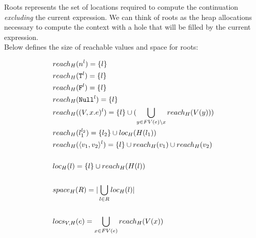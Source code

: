 \documentclass[11pt]{article}
\newcommand{\irl}[1]{\mathtt{#1}}
\begin{document}
Roots represents the set of locations required to compute the continuation \emph{excluding} the current expression.
We can think of roots as the heap allocations necessary to compute the context with a hole that will be filled
by the current expression.\\

Below defines the size of reachable values and space for roots:

\begin{align*}
  &reach_{H}(n^l) = \{l\}\\
  &reach_{H}(\irl{T}^l) = \{l\}\\
  &reach_{H}(\irl{F}^l) = \{l\}\\
  &reach_{H}(\irl{Null}^l) = \{l\}\\
  &reach_{H}((V, x.e)^l) = \{l\} \cup (\bigcup\limits_{y \in FV(e) \setminus x} reach_H(V(y))) \\
  &reach_{H}(l_1^{l_2}) = \{l_2\} \cup loc_{H}(H(l_1))\\
  &reach_{H}(\pairexcst{v_1}{v_2}^l) = \{l\} \cup reach_{H}(v_1) \cup reach_{H}(v_2)\\\\
  &loc_{H}(l) = \{l\} \cup reach_{H}(H(l))\\\\
  &space_{H}(R) = |\bigcup\limits_{l \in R} loc_{H}(l)|\\\\
  &locs_{V,H}(e) = \bigcup\limits_{x \in FV(e)} reach_H(V(x))
\end{align*}
\end{document}
